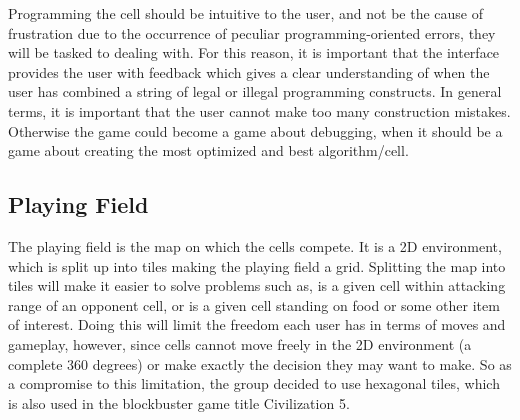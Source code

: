 Programming the cell should be intuitive to the user, and not be the cause of frustration due to the occurrence of peculiar programming-oriented errors, they will be tasked to dealing with.
For this reason, it is important that the interface provides the user with feedback which gives a clear understanding of when the user has combined a string of legal or illegal programming constructs.
In general terms, it is important that the user cannot make too many construction mistakes.
Otherwise the game could become a game about debugging, when it should be a game about creating the most optimized and best algorithm/cell.

\subsection{Playing Field}

The playing field is the map on which the cells compete.
It is a 2D environment, which is split up into tiles making the playing field a grid.
Splitting the map into tiles will make it easier to solve problems such as, is a given cell within attacking range of an opponent cell, or is a given cell standing on food or some other item of interest.
Doing this will limit the freedom each user has in terms of moves and gameplay, however, since cells cannot move freely in the 2D environment (a complete 360 degrees) or make exactly the decision they may want to make. 
So as a compromise to this limitation, the group decided to use hexagonal tiles, which is also used in the blockbuster game title Civilization 5.